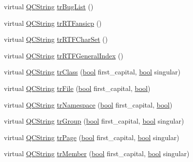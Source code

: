 \begin{DoxyCompactItemize}
\item 
virtual \hyperlink{class_q_c_string}{Q\+C\+String} \hyperlink{class_translator_italian_a3a0c0ea29db7016556e5dc167e3c1c28}{tr\+Bug\+List} ()
\item 
virtual \hyperlink{class_q_c_string}{Q\+C\+String} \hyperlink{class_translator_italian_a27b5da596f7778f5167ea53e5294f418}{tr\+R\+T\+Fansicp} ()
\item 
virtual \hyperlink{class_q_c_string}{Q\+C\+String} \hyperlink{class_translator_italian_a84e928830059a03c4be6680998820f25}{tr\+R\+T\+F\+Char\+Set} ()
\item 
virtual \hyperlink{class_q_c_string}{Q\+C\+String} \hyperlink{class_translator_italian_a119438dfb5ccefab32e500b8b8d8ee7a}{tr\+R\+T\+F\+General\+Index} ()
\item 
virtual \hyperlink{class_q_c_string}{Q\+C\+String} \hyperlink{class_translator_italian_a43814783b774642e4f9aa38592e00ffd}{tr\+Class} (\hyperlink{qglobal_8h_a1062901a7428fdd9c7f180f5e01ea056}{bool} first\+\_\+capital, \hyperlink{qglobal_8h_a1062901a7428fdd9c7f180f5e01ea056}{bool} singular)
\item 
virtual \hyperlink{class_q_c_string}{Q\+C\+String} \hyperlink{class_translator_italian_a9229cf743df7121024614b8b60603427}{tr\+File} (\hyperlink{qglobal_8h_a1062901a7428fdd9c7f180f5e01ea056}{bool} first\+\_\+capital, \hyperlink{qglobal_8h_a1062901a7428fdd9c7f180f5e01ea056}{bool})
\item 
virtual \hyperlink{class_q_c_string}{Q\+C\+String} \hyperlink{class_translator_italian_adb8ad11a5f174e4540487bad78e4ca31}{tr\+Namespace} (\hyperlink{qglobal_8h_a1062901a7428fdd9c7f180f5e01ea056}{bool} first\+\_\+capital, \hyperlink{qglobal_8h_a1062901a7428fdd9c7f180f5e01ea056}{bool})
\item 
virtual \hyperlink{class_q_c_string}{Q\+C\+String} \hyperlink{class_translator_italian_a3d3b18c55cbaac586b581333a90023ac}{tr\+Group} (\hyperlink{qglobal_8h_a1062901a7428fdd9c7f180f5e01ea056}{bool} first\+\_\+capital, \hyperlink{qglobal_8h_a1062901a7428fdd9c7f180f5e01ea056}{bool} singular)
\item 
virtual \hyperlink{class_q_c_string}{Q\+C\+String} \hyperlink{class_translator_italian_a1301374a6a2e47a63673bb1391c54bd2}{tr\+Page} (\hyperlink{qglobal_8h_a1062901a7428fdd9c7f180f5e01ea056}{bool} first\+\_\+capital, \hyperlink{qglobal_8h_a1062901a7428fdd9c7f180f5e01ea056}{bool} singular)
\item 
virtual \hyperlink{class_q_c_string}{Q\+C\+String} \hyperlink{class_translator_italian_a6df842fcb80263a781aff7305bf71763}{tr\+Member} (\hyperlink{qglobal_8h_a1062901a7428fdd9c7f180f5e01ea056}{bool} first\+\_\+capital, \hyperlink{qglobal_8h_a1062901a7428fdd9c7f180f5e01ea056}{bool} singular)

\end{DoxyCompactItemize}
